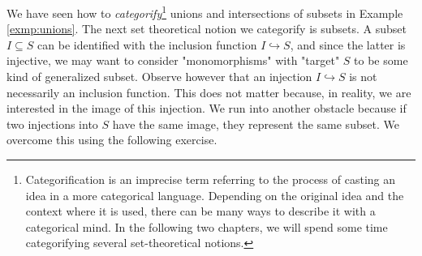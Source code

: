 \documentclass[main.tex]{subfiles}
\begin{document}
We have seen how to \textit{categorify}\footnote{Categorification is an imprecise term referring to the process of casting an idea in a more categorical language. Depending on the original idea and the context where it is used, there can be many ways to describe it with a categorical mind. In the following two chapters, we will spend some time categorifying several set-theoretical notions.} unions and intersections of subsets in Example \ref{exmp:unions}. The next set theoretical notion we categorify is subsets. A subset $I \subseteq S$ can be identified with the inclusion function $I \hookrightarrow S$, and since the latter is injective, we may want to consider "monomorphisms" with "target" $S$ to be some kind of generalized subset. Observe however that an injection $I \hookrightarrow S$ is not necessarily an inclusion function. This does not matter because, in reality, we are interested in the image of this injection. We run into another obstacle because if two injections into $S$ have the same image, they represent the same subset. We overcome this using the following exercise.
\end{document}

